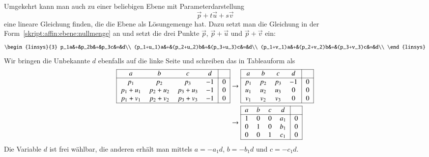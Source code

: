 Umgekehrt kann man auch zu einer beliebigen Ebene mit Parameterdarstellung
\[
\vec{p}+t\vec{u}+s\vec{v}
\]
eine lineare Gleichung finden, die die Ebene als Lösungemenge hat.
Dazu setzt man die Gleichung in der
Form~\eqref{skript:affin:ebene:nullmenge} an und setzt die drei
Punkte $\vec{p}$, $\vec{p}+\vec{u}$ und $\vec{p}+\vec{v}$ ein:
\[
\begin{linsys}{3}
p_1a&+&p_2b&+&p_3c&=&d\\
(p_1+u_1)a&+&(p_2+u_2)b&+&(p_3+u_3)c&=&d\\
(p_1+v_1)a&+&(p_2+v_2)b&+&(p_3+v_3)c&=&d\\
\end{linsys}
\]
Wir bringen die Unbekannte $d$ ebenfalls auf die linke Seite und schreiben
das in Tableauform als
\begin{align}
\begin{tabular}{|>{$}c<{$}>{$}c<{$}>{$}c<{$}>{$}c<{$}|>{$}c<{$}|}
\hline
a&b&c&d&\\
\hline
p_1&p_2&p_3&-1&0\\
p_1+u_1&p_2+u_2&p_3+u_3&-1&0\\
p_1+v_1&p_2+v_2&p_3+v_3&-1&0\\
\hline
\end{tabular}
&\rightarrow
\begin{tabular}{|>{$}c<{$}>{$}c<{$}>{$}c<{$}>{$}c<{$}|>{$}c<{$}|}
\hline
a&b&c&d&\\
\hline
p_1&p_2&p_3&-1&0\\
u_1&u_2&u_3& 0&0\\
v_1&v_2&v_3& 0&0\\
\hline
\end{tabular}
\label{skript:affin:ebene:abcd}
\\
&\rightarrow
\begin{tabular}{|>{$}c<{$}>{$}c<{$}>{$}c<{$}>{$}c<{$}|>{$}c<{$}|}
\hline
a&b&c&d&\\
\hline
1&0&0&a_1&0\\
0&1&0&b_1&0\\
0&0&1&c_1&0\\
\hline
\end{tabular}
\notag
\end{align}
Die Variable $d$ ist frei wählbar, die anderen erhält man mittels
$a=-a_1d$, $b=-b_1d$ und $c=-c_1d$.

